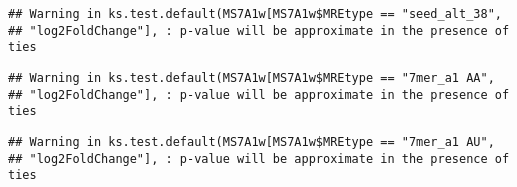 \documentclass[
]{article}
\newenvironment{Shaded}{\begin{snugshade}}{\end{snugshade}}
\newcommand{\FunctionTok}[1]{\textcolor[rgb]{0.13,0.29,0.53}{\textbf{#1}}}
\newcommand{\NormalTok}[1]{#1}
\newcommand{\OtherTok}[1]{\textcolor[rgb]{0.56,0.35,0.01}{#1}}
\newcommand{\SpecialCharTok}[1]{\textcolor[rgb]{0.81,0.36,0.00}{\textbf{#1}}}
\newcommand{\StringTok}[1]{\textcolor[rgb]{0.31,0.60,0.02}{#1}}
\begin{document}
\begin{verbatim}
## Warning in ks.test.default(MS7A1w[MS7A1w$MREtype == "seed_alt_38",
## "log2FoldChange"], : p-value will be approximate in the presence of ties
\end{verbatim}

\begin{Shaded}
\end{Shaded}

\begin{verbatim}
## Warning in ks.test.default(MS7A1w[MS7A1w$MREtype == "7mer_a1 AA",
## "log2FoldChange"], : p-value will be approximate in the presence of ties
\end{verbatim}

\begin{Shaded}
\end{Shaded}

\begin{verbatim}
## Warning in ks.test.default(MS7A1w[MS7A1w$MREtype == "7mer_a1 AU",
## "log2FoldChange"], : p-value will be approximate in the presence of ties
\end{verbatim}
\end{document}

